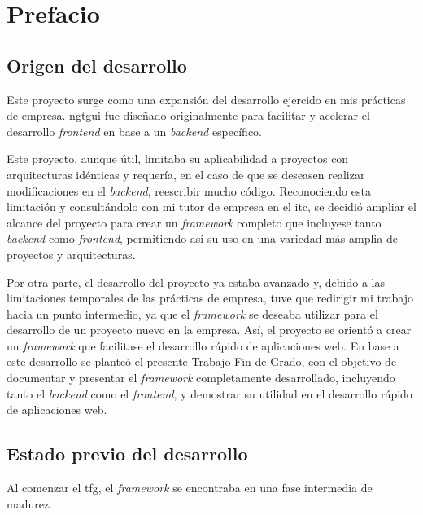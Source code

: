 \chapter{Prefacio}
\label{ch:prefacio}

\section{Origen del desarrollo}
\label{sec:origen}

Este proyecto surge como una expansión del desarrollo ejercido en mis prácticas de empresa.
\gls{ngtgui} fue diseñado originalmente para facilitar y acelerar el desarrollo
\textit{frontend} en base a un \textit{backend} específico.

Este proyecto, aunque útil, limitaba su aplicabilidad a proyectos con arquitecturas
idénticas y requería, en el caso de que se deseasen realizar modificaciones en el
\textit{backend}, reescribir mucho código. Reconociendo esta limitación y consultándolo
con mi tutor de empresa en el \gls{itc}, se decidió ampliar el alcance del proyecto para
crear un \textit{framework} completo que incluyese tanto \textit{backend} como
\textit{frontend}, permitiendo así su uso en una variedad más amplia de proyectos y
arquitecturas.

Por otra parte, el desarrollo del proyecto ya estaba avanzado y, debido a las limitaciones
temporales de las prácticas de empresa, tuve que redirigir mi trabajo hacia un punto
intermedio, ya que el \textit{framework} se deseaba utilizar para el desarrollo de un
proyecto nuevo en la empresa. Así, el proyecto se orientó a crear un \textit{framework}
que facilitase el desarrollo rápido de aplicaciones web. En base a este desarrollo se
planteó el presente Trabajo Fin de Grado, con el objetivo de documentar y presentar el
\textit{framework} completamente desarrollado, incluyendo tanto el \textit{backend} como
el \textit{frontend}, y demostrar su utilidad en el desarrollo rápido de aplicaciones web.

\section{Estado previo del desarrollo}
\label{sec:estado-previo}

Al comenzar el \gls{tfg}, el \textit{framework} se encontraba en una fase intermedia de
madurez.

